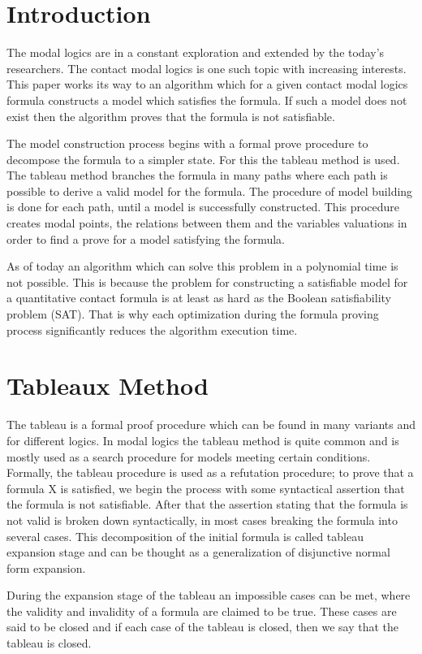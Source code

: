 \documentclass{article}
\begin{document}
	\section{Introduction}
	The modal logics are in a constant exploration and extended by the today's researchers. The contact modal logics is one such topic with increasing interests. This paper works its way to an algorithm which for a given contact modal logics formula constructs a model which satisfies the formula. If such a model does not exist then the algorithm proves that the formula is not satisfiable. 

The model construction process begins with a formal prove procedure to decompose the formula to a simpler state. For this the tableau method is used. The tableau method branches the formula in many paths where each path is possible to derive a valid model for the formula. The procedure of model building is done for each path, until a model is successfully constructed. This procedure creates modal points, the relations between them and the variables valuations in order to find a prove for a model satisfying the formula. 

As of today an algorithm which can solve this problem in a polynomial time is not possible. This is because the problem for constructing a satisfiable model for a quantitative contact formula is at least as hard as the Boolean satisfiability problem (SAT). That is why each optimization during the formula proving process significantly reduces the algorithm execution time.

	\newpage
	\section{Tableaux Method}
	The tableau is a formal proof procedure which can be found in many variants and for different logics. In modal logics the tableau method is quite common and is mostly used as a search procedure for models meeting certain conditions.
Formally, the tableau procedure is used as a refutation procedure; to prove that a formula X is satisfied, we begin the process with some syntactical assertion that the formula is not satisfiable. After that the assertion stating that the formula is not valid is broken down syntactically, in most cases breaking the formula into several cases. This decomposition of the initial formula is called tableau expansion stage and can be thought as a generalization of disjunctive normal form expansion. 

During the expansion stage of the tableau an impossible cases can be met, where the validity and invalidity of a formula are claimed to be true. These cases are said to be closed and if each case of the tableau is closed, then we say that the tableau is closed.
\end{document}
